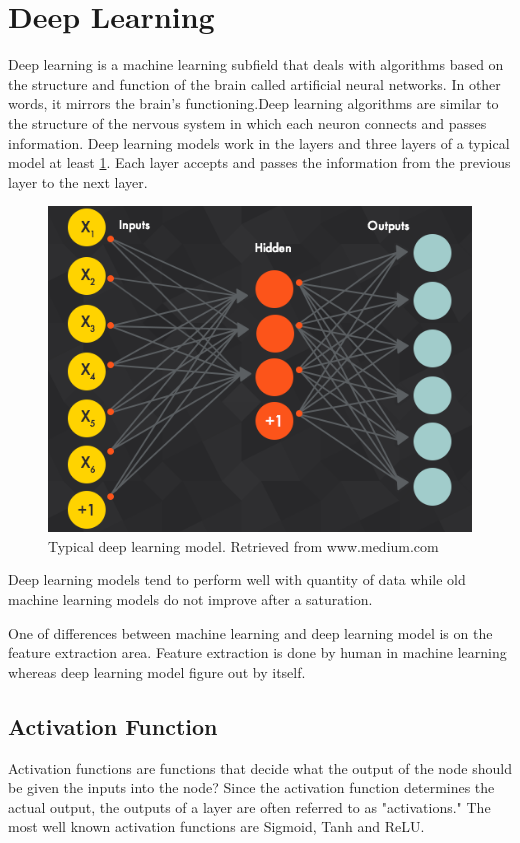 \documentclass[12pt]{report}
\begin{document}
\clearpage
\section{Deep Learning}
    Deep learning is a machine learning subfield that deals with algorithms based 
    on the structure and function of the brain called artificial neural networks. 
    In other words, it mirrors the brain's functioning.Deep learning algorithms are similar to the structure of 
    the nervous system in which each neuron connects and passes information.
    Deep learning models work in the layers and three layers of a typical model at least \ref{fig:deep_learining}. 
    Each layer accepts and passes the information from the previous layer to the next layer.

    \begin{figure} [h]
        \centering
        \includegraphics[width=\textwidth]{./images/deep_learning.png}
        \caption{Typical deep learning model. Retrieved from www.medium.com}
        \label{fig:deep_learining}
    \end{figure}

    Deep learning models tend to perform well with quantity of data while old machine 
    learning models do not improve after a saturation.

    One of differences between machine learning and deep learning model is on the feature extraction area. 
    Feature extraction is done by human in machine learning whereas deep learning model figure out by itself.

    \subsection{Activation Function}
    Activation functions are functions that decide what the output of the node should be given the inputs into the node? 
    Since the activation function determines the actual output, the outputs of a layer are often referred to as "activations."
    The most well known activation functions are Sigmoid, Tanh and ReLU.
\end{document}
